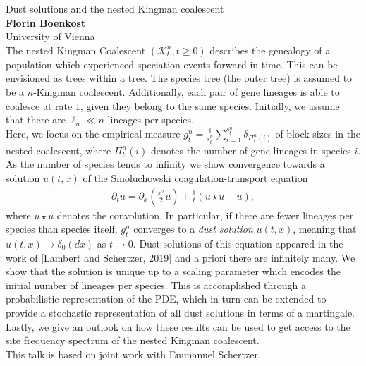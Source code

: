 \documentclass[12pt,a4paper]{article}
\begin{document}
\noindent
{\Large Dust solutions and the nested Kingman coalescent}\\[1ex]
{\large 
\textbf{Florin Boenkost}\\[1ex] University of Vienna}\\[2ex]
The nested Kingman Coalescent $(\mathcal{K}^n_t, t\geq 0)$ describes the genealogy of a population which experienced speciation events forward in time. This can be envisioned as trees within a tree. The species tree (the outer tree) is assumed to be a $n$-Kingman coalescent. Additionally, each pair of gene lineages is able to coalesce at rate $1$, given they belong to the same species. Initially, we assume that there are $\ell_n \ll n$ lineages per species.
\\
Here, we focus on the empirical measure $g^n_{t}= \frac{1}{s^n_t} \sum_{i=1}^{s_t^n} \delta_{\Pi_t^n (i)}$ of block sizes in the nested coalescent, where $\Pi_t^n (i)$ denotes the number of gene lineages in  species $i$. As the number of species tends to infinity we show convergence towards a solution $u(t,x)$ of the Smoluchowski coagulation-transport equation
\begin{align*}
	\partial_t u = \partial_x \left( \frac{x^2}{2} u\right) + \frac{1}{t} ( u \star u -u ),
\end{align*}
where $u \star u$ denotes the convolution. In particular, if there are fewer lineages per species than species itself, $g_t^n$ converges to a \emph{dust solution} $u(t,x)$, meaning that $u(t,x) \to \delta_0(dx)$ as $t\to 0$. Dust solutions of this equation appeared in the work of [Lambert and Schertzer, 2019] and a priori there are infinitely many. We show that the solution is unique up to a scaling parameter which encodes the initial number of lineages per species. This is accomplished through a probabilistic representation of the PDE, which in turn can be extended to provide a stochastic representation of all dust solutions in terms of a martingale. Lastly, we give an outlook on how these results can be used to get access to the site frequency spectrum of the nested Kingman coalescent.
\\
This talk is based on joint work with Emmanuel Schertzer. 

\bigskip
\bigskip

\end{document}
